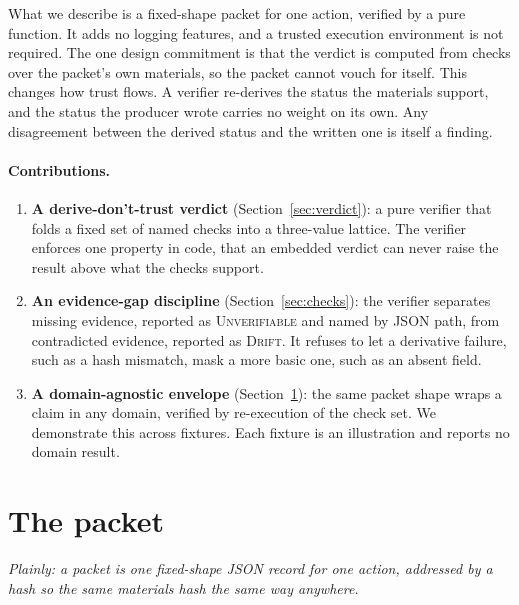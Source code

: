 \documentclass[11pt]{article}
\begin{document}
What we describe is a fixed-shape packet for one action, verified by a pure function. It adds no logging features, and a trusted execution environment is not required. The one design commitment is that the verdict is computed from checks over the packet's own materials, so the packet cannot vouch for itself. This changes how trust flows. A verifier re-derives the status the materials support, and the status the producer wrote carries no weight on its own. Any disagreement between the derived status and the written one is itself a finding.

\paragraph{Contributions.}
\begin{enumerate}[leftmargin=*,itemsep=2pt]
\item \textbf{A derive-don't-trust verdict} (Section~\ref{sec:verdict}): a pure verifier that folds a fixed set of named checks into a three-value lattice. The verifier enforces one property in code, that an embedded verdict can never raise the result above what the checks support.
\item \textbf{An evidence-gap discipline} (Section~\ref{sec:checks}): the verifier separates missing evidence, reported as \textsc{Unverifiable} and named by JSON path, from contradicted evidence, reported as \textsc{Drift}. It refuses to let a derivative failure, such as a hash mismatch, mask a more basic one, such as an absent field.
\item \textbf{A domain-agnostic envelope} (Section~\ref{sec:envelope}): the same packet shape wraps a claim in any domain, verified by re-execution of the check set. We demonstrate this across fixtures. Each fixture is an illustration and reports no domain result.
\end{enumerate}

\section{The packet}\label{sec:envelope}
\emph{Plainly: a packet is one fixed-shape JSON record for one action, addressed by a hash so the same materials hash the same way anywhere.}
\end{document}
